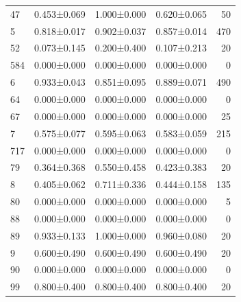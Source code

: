 \begin{tabular}{lrrrr}
47 & 0.453±0.069 & 1.000±0.000 & 0.620±0.065 & 50 \\
5 & 0.818±0.017 & 0.902±0.037 & 0.857±0.014 & 470 \\
52 & 0.073±0.145 & 0.200±0.400 & 0.107±0.213 & 20 \\
584 & 0.000±0.000 & 0.000±0.000 & 0.000±0.000 & 0 \\
6 & 0.933±0.043 & 0.851±0.095 & 0.889±0.071 & 490 \\
64 & 0.000±0.000 & 0.000±0.000 & 0.000±0.000 & 0 \\
67 & 0.000±0.000 & 0.000±0.000 & 0.000±0.000 & 25 \\
7 & 0.575±0.077 & 0.595±0.063 & 0.583±0.059 & 215 \\
717 & 0.000±0.000 & 0.000±0.000 & 0.000±0.000 & 0 \\
79 & 0.364±0.368 & 0.550±0.458 & 0.423±0.383 & 20 \\
8 & 0.405±0.062 & 0.711±0.336 & 0.444±0.158 & 135 \\
80 & 0.000±0.000 & 0.000±0.000 & 0.000±0.000 & 5 \\
88 & 0.000±0.000 & 0.000±0.000 & 0.000±0.000 & 0 \\
89 & 0.933±0.133 & 1.000±0.000 & 0.960±0.080 & 20 \\
9 & 0.600±0.490 & 0.600±0.490 & 0.600±0.490 & 20 \\
90 & 0.000±0.000 & 0.000±0.000 & 0.000±0.000 & 0 \\
99 & 0.800±0.400 & 0.800±0.400 & 0.800±0.400 & 20 \\
\bottomrule
\end{tabular}
